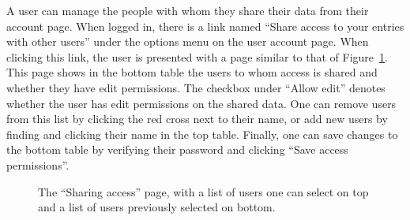 A user can manage the people with whom they share their data from their account page.
When logged in, there is a link named ``Share access to your entries with other users''
 under the options menu on the user account page.
When clicking this link, the user is presented with a page similar to that of
 Figure~\ref{fig:c05s05_screenshot_access_sharing}.
This page shows in the bottom table the users to whom access is shared and whether they have edit permissions.
The checkbox under ``Allow edit'' denotes whether the user has edit permissions on the shared data.
One can remove users from this list by clicking the red cross next to their name,
 or add new users by finding and clicking their name in the top table.
Finally, one can save changes to the bottom table by verifying their password and clicking ``Save access permissions''.

\begin{figure}[ht]
  \begin{shaded}
  \caption{%
    The ``Sharing access'' page, with a list of users one can select on top and a
     list of users previously selected on bottom.}
  \label{fig:c05s05_screenshot_access_sharing}
  \end{shaded}
\end{figure}


